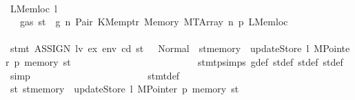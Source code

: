 \begin{isabellebody}
\isanewline
\ \ \ \ \ \ \ \ \ \ \ \ \ \ \ \ \ \ \ \ \ \ \isamarkupfalse%
\isanewline
\ \ \ \ \ \ \ \ \ \ \ \ \ \ \ \ \ \ \ \ \isamarkupfalse%
\isanewline
\ \ \ \ \ \ \ \ \ \ \ \ \ \ \ \ \ \ \ \ \ \ \isamarkupfalse%
\ {\isacharparenleft}{\kern0pt}LMemloc\ l{\isacharparenright}{\kern0pt}\isanewline
\ \ \ \ \ \ \ \ \ \ \ \ \ \ \ \ \ \ \ \ \ \ \isamarkupfalse%
\ {}{\isacharparenleft}{\kern0pt}{}{\isacharparenright}{\kern0pt}\ {\isacharbackquoteopen}{\isasymnot}\ gas\ st\ {\isasymle}\ g{\isacharbackquoteclose}\ n\ Pair\ KMemptr\ Memory\ MTArray\ n{}\ p{}\ LMemloc\isanewline
\ \ \ \ \ \ \ \ \ \ \ \ \ \ \ \ \ \ \ \ \ \ \isamarkupfalse%
\ {\isachardoublequoteopen}stmt\ {\isacharparenleft}{\kern0pt}ASSIGN\ lv\ ex{\isacharparenright}{\kern0pt}\ env\ cd\ st\ {\isacharequal}{\kern0pt}\ \ Normal\ {\isacharparenleft}{\kern0pt}{\isacharparenleft}{\kern0pt}{\isacharparenright}{\kern0pt}{\isacharcomma}{\kern0pt}\ st{\isacharprime}{\kern0pt}{\isacharprime}{\kern0pt}{\isacharprime}{\kern0pt}{\isasymlparr}memory\ {\isacharcolon}{\kern0pt}{\isacharequal}{\kern0pt}\ updateStore\ l\ {\isacharparenleft}{\kern0pt}MPointer\ p{\isacharparenright}{\kern0pt}\ {\isacharparenleft}{\kern0pt}memory\ st{\isacharprime}{\kern0pt}{\isacharprime}{\kern0pt}{\isacharprime}{\kern0pt}{\isacharparenright}{\kern0pt}{\isasymrparr}{\isacharparenright}{\kern0pt}{\isachardoublequoteclose}\isanewline
\ \ \ \ \ \ \ \ \ \ \ \ \ \ \ \ \ \ \ \ \ \ \ \ \isamarkupfalse%
\ stmt{\isachardot}{\kern0pt}psimps{\isacharparenleft}{\kern0pt}{}{\isacharparenright}{\kern0pt}\ g{\isacharunderscore}{\kern0pt}def\ st{\isacharprime}{\kern0pt}{\isacharunderscore}{\kern0pt}def\ st{\isacharprime}{\kern0pt}{\isacharprime}{\kern0pt}{\isacharunderscore}{\kern0pt}def\ st{\isacharprime}{\kern0pt}{\isacharprime}{\kern0pt}{\isacharprime}{\kern0pt}{\isacharunderscore}{\kern0pt}def\ \isamarkupfalse%
\ simp\isanewline
\ \ \ \ \ \ \ \ \ \ \ \ \ \ \ \ \ \ \ \ \ \ \isamarkupfalse%
\ stmt{\isacharunderscore}{\kern0pt}def\ \isamarkupfalse%
\ {\isachardoublequoteopen}st{}{\isacharprime}{\kern0pt}{\isacharequal}{\kern0pt}\ st{\isacharprime}{\kern0pt}{\isacharprime}{\kern0pt}{\isacharprime}{\kern0pt}{\isasymlparr}memory\ {\isacharcolon}{\kern0pt}{\isacharequal}{\kern0pt}\ updateStore\ l\ {\isacharparenleft}{\kern0pt}MPointer\ p{\isacharparenright}{\kern0pt}\ {\isacharparenleft}{\kern0pt}memory\ st{\isacharprime}{\kern0pt}{\isacharprime}{\kern0pt}{\isacharprime}{\kern0pt}{\isacharparenright}{\kern0pt}{\isasymrparr}{\isachardoublequoteclose}\ \isamarkupfalse%

\end{isabellebody}

